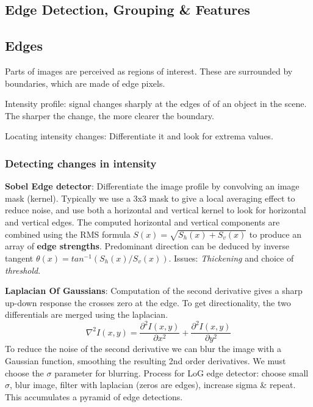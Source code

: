 \documentclass[8pt]{extarticle}
\begin{document}
\begin{multicols}{2}
\section{Edge Detection, Grouping \& Features}

\subsection{Edges}
\begin{compactitem}
    \item Parts of images are perceived as regions of interest. These are surrounded by boundaries, which are made of edge pixels.
    \item Intensity profile: signal changes sharply at the edges of of an object in the scene. The sharper the change, the more clearer the boundary.
    \item Locating intensity changes: Differentiate it and look for extrema values.
\end{compactitem}

\subsubsection{Detecting changes in intensity}
\textbf{Sobel Edge detector}: Differentiate the image profile by convolving an image mask (kernel). Typically we use a 3x3 mask to give a local averaging effect to reduce noise, and use both a horizontal and vertical kernel to look for horizontal and vertical edges. The computed horizontal and vertical components are combined using the RMS formula $S(x) = \sqrt{S_h(x) + S_v(x)}$ to produce an array of \textbf{edge strengths}. Predominant direction can be deduced by inverse tangent $\theta(x) = tan^{-1}(S_h(x) / S_v(x))$. Issues: \textit{Thickening} and choice of \textit{threshold}.

\textbf{Laplacian Of Gaussians}: Computation of the second derivative gives a sharp up-down response the crosses zero at the edge. To get directionality, the two         differentials are merged using the laplacian.
    \begin{equation}
        \nabla^2I(x,y) = \frac{\partial^2 I(x,y)}{\partial x^2} + \frac{\partial^2 I(x,y)}{\partial y^2}
    \end{equation}
    To reduce the noise of the second derivative we can blur the image with a Gaussian function, smoothing the resulting 2nd order derivatives. We must choose the $\sigma$ parameter for blurring. Process for LoG edge detector: choose small $\sigma$, blur image, filter with laplacian (zeros are edges), increase sigma \& repeat. This accumulates a pyramid of edge detections.


\end{multicols}
\end{document}
